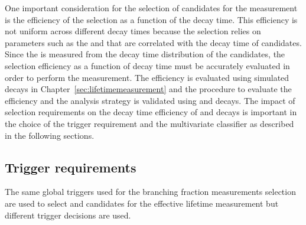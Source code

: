 One important consideration for the selection of candidates for the \bsmumu \el measurement is the efficiency of the selection as a function of the \bs decay time. This efficiency is not uniform across different decay times because the selection relies on parameters such as the \chiIP and \chiFD that are correlated with the decay time of \bsmumu candidates.
Since the \el is measured from the decay time distribution of the candidates, the selection efficiency as a function of decay time must be accurately evaluated in order to perform the measurement. The efficiency is evaluated using simulated \bsmumu decays in Chapter~\ref{sec:lifetimemeasurement}
and the procedure to evaluate the efficiency and the analysis strategy is validated using \bdkpi and \bskk decays. The impact of selection requirements on the decay time efficiency of \bsmumu and \bhh decays is important in the choice of the trigger requirement and the multivariate classifier as described in the following sections.







\subsection{Trigger requirements}
\label{sec:ELtrigger}
The same global triggers used for the branching fraction measurements selection are used to select \bsmumu and \bhh candidates for the effective lifetime measurement but different trigger decisions are used. 

